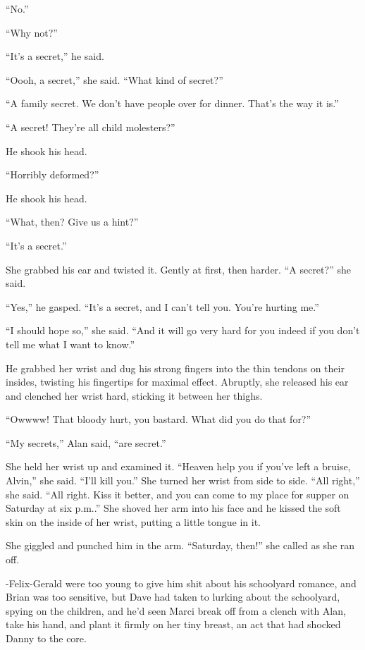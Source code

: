 ``No.''

``Why not?''

``It's a secret,'' he said.

``Oooh, a secret,'' she said.  ``What kind of secret?''

``A family secret.  We don't have people over for dinner.  That's the
way it is.''

``A secret!  They're all child molesters?''

He shook his head.

``Horribly deformed?''

He shook his head.

``What, then?  Give us a hint?''

``It's a secret.''

She grabbed his ear and twisted it.  Gently at first, then harder. 
``A secret?'' she said.

``Yes,'' he gasped.  ``It's a secret, and I can't tell you.  You're
hurting me.''

``I should hope so,'' she said.  ``And it will go very hard for you
indeed if you don't tell me what I want to know.''

He grabbed her wrist and dug his strong fingers into the thin tendons
on their insides, twisting his fingertips for maximal effect. 
Abruptly, she released his ear and clenched her wrist hard, sticking
it between her thighs.

``Owwww!  That bloody hurt, you bastard.  What did you do that for?''

``My secrets,'' Alan said, ``are secret.''

She held her wrist up and examined it.  ``Heaven help you if you've
left a bruise, Alvin,'' she said.  ``I'll kill you.'' She turned her
wrist from side to side.  ``All right,'' she said.  ``All right.  Kiss
it better, and you can come to my place for supper on Saturday at six
p.m..'' She shoved her arm into his face and he kissed the soft skin
on the inside of her wrist, putting a little tongue in it.

She giggled and punched him in the arm.  ``Saturday, then!'' she
called as she ran off.

-Felix-Gerald were too young to give him shit about his
schoolyard romance, and Brian was too sensitive, but Dave had taken to
lurking about the schoolyard, spying on the children, and he'd seen
Marci break off from a clench with Alan, take his hand, and plant it
firmly on her tiny breast, an act that had shocked Danny to the core.

